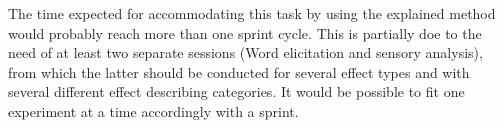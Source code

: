 \noindent
The time expected for accommodating this task by using the explained method would probably reach more than one sprint cycle. This is partially doe to the need of at least two separate sessions (Word elicitation and sensory analysis), from which the latter should be conducted for several effect types and with several different effect describing categories. It would be possible to fit one experiment at a time accordingly with a sprint. 


